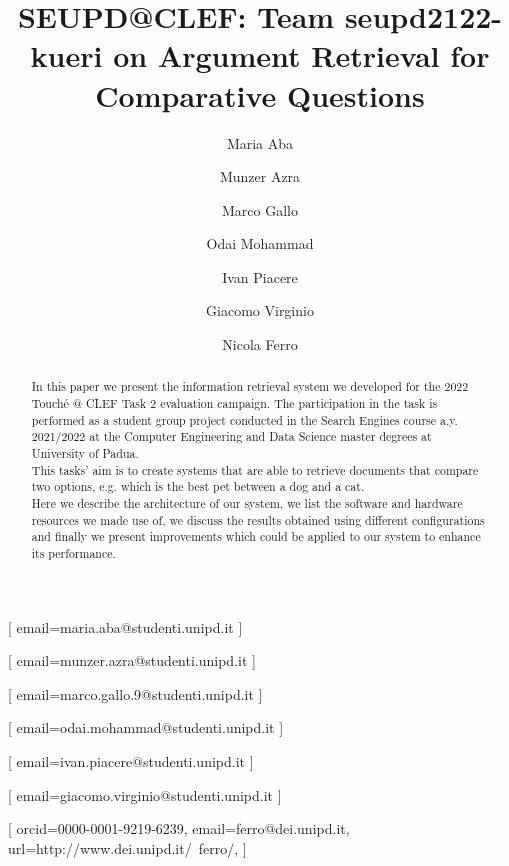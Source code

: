 \documentclass{ceurart}
\begin{document}

	
\title{SEUPD@CLEF: Team seupd2122-kueri on Argument Retrieval for Comparative Questions}

\author[1]{Maria Aba}[%
email=maria.aba@studenti.unipd.it
]

\author[1]{Munzer Azra}[%
email=munzer.azra@studenti.unipd.it
]

\author[1]{Marco Gallo}[%
email=marco.gallo.9@studenti.unipd.it
]

\author[1]{Odai Mohammad}[%
email=odai.mohammad@studenti.unipd.it
]

\author[1]{Ivan Piacere}[%
email=ivan.piacere@studenti.unipd.it
]

\author[1]{Giacomo Virginio}[%
email=giacomo.virginio@studenti.unipd.it
]

\author[1]{Nicola Ferro}[%
orcid=0000-0001-9219-6239,
email=ferro@dei.unipd.it,
url=http://www.dei.unipd.it/~ferro/,
]

\address[1]{University of Padua, Italy}


\begin{abstract}
	In this paper we present the information retrieval system we developed for the 2022 Touché @ CLEF Task 2 evaluation campaign. The participation in the task is performed as a student group project conducted in the Search Engines course a.y. 2021/2022 at the Computer Engineering and Data Science master degrees at University of Padua.\\
	This tasks' aim is to create systems that are able to retrieve documents that compare two options, e.g. which is the best pet between a dog and a cat.\\
	Here we describe the architecture of our system, we list the software and hardware resources we made use of, we discuss the results obtained using different configurations and finally we present improvements which could be applied to our system to enhance its performance.
\end{abstract}
\end{document}
